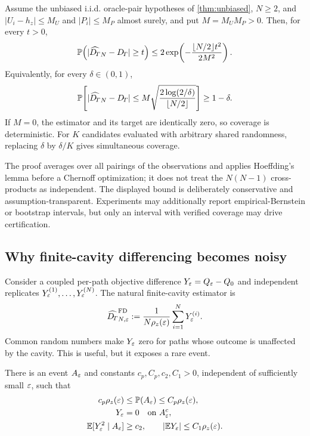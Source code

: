 \begin{theorem}
\label{thm:concentration}
Assume the unbiased i.i.d. oracle-pair hypotheses of \cref{thm:unbiased}, $N\ge2$, and $|U_i-h_z|\le M_U$ and $|P_i|\le M_P$ almost surely, and put
$M=M_UM_P>0$. Then, for every $t>0$,
\begin{equation}
 \mathbb{P}\!\left(|\widehat{D_{\!T}}_N-D_{\!T}|\ge t\right)
 \le2\exp\!\left(
 -\frac{\lfloor N/2\rfloor t^2}{2M^2}\right).
 \label{eq:hoeffdingtail}
\end{equation}
Equivalently, for every $\delta\in(0,1)$,
\begin{equation}
 \mathbb{P}\!\left[
 |\widehat{D_{\!T}}_N-D_{\!T}|
 \le M\sqrt{\frac{2\log(2/\delta)}{\lfloor N/2\rfloor}}
 \right]\ge1-\delta.
 \label{eq:hoeffdingradius}
\end{equation}
If $M=0$, the estimator and its target are identically zero, so coverage is deterministic. For $K$ candidates evaluated with arbitrary shared randomness, replacing
$\delta$ by $\delta/K$ gives simultaneous coverage.
\end{theorem}

The proof averages over all pairings of the observations and applies
Hoeffding's lemma before a Chernoff optimization; it does not treat the
$N(N-1)$ cross-products as independent.  The displayed bound is deliberately
conservative and assumption-transparent.  Experiments may additionally report
empirical-Bernstein or bootstrap intervals, but only an interval with verified
coverage may drive certification.

\subsection{Why finite-cavity differencing becomes noisy}

Consider a coupled per-path objective difference $Y_\varepsilon=Q_\varepsilon-Q_0$ and
independent replicates $Y_\varepsilon^{(1)},\ldots,Y_\varepsilon^{(N)}$.  The natural
finite-cavity estimator is
\begin{equation}
 \widehat{D_{\!T}}^{\mathrm{FD}}_{N,\varepsilon}
 :=\frac{1}{N\rho_z(\varepsilon)}\sum_{i=1}^{N}Y_\varepsilon^{(i)}.
 \label{eq:fdbaseline}
\end{equation}
Common random numbers make $Y_\varepsilon$ zero for paths whose outcome is unaffected
by the cavity.  This is useful, but it exposes a rare event.

\begin{assumption}
\label{ass:rareevent}
There is an event $A_\varepsilon$ and constants $c_p,C_p,c_2,C_1>0$, independent of
sufficiently small $\varepsilon$, such that
\begin{align}
 c_p\rho_z(\varepsilon)&\le\mathbb{P}(A_\varepsilon)\le C_p\rho_z(\varepsilon),
 \label{eq:rareprob}\\
 Y_\varepsilon&=0\quad\text{on }A_\varepsilon^c,
 \label{eq:rarezero}\\
 \mathbb{E}[Y_\varepsilon^2\mid A_\varepsilon]&\ge c_2,
 \qquad |\mathbb{E} Y_\varepsilon|\le C_1\rho_z(\varepsilon).
 \label{eq:raremoments}
\end{align}
\end{assumption}

